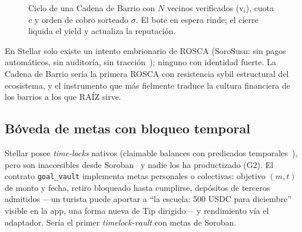 \documentclass[twocolumn,10pt]{article}
\begin{document}
\begin{figure}[t]
\centering
{}
\caption{Ciclo de una Cadena de Barrio con $N$ vecinos verificados (v$_i$), cuota $c$ y orden de cobro sorteado $\sigma$. El bote en espera rinde; el cierre liquida el yield y actualiza la reputaci\'on.}
\label{fig:cadena}
\end{figure}

En Stellar solo existe un intento embrionario de ROSCA (SoroSusu: sin pagos autom\'aticos, sin auditor\'ia, sin tracci\'on~\cite{sorosusu}); ninguno con identidad fuerte. La Cadena de Barrio ser\'ia la primera ROSCA con resistencia sybil estructural del ecosistema, y el instrumento que m\'as fielmente traduce la cultura financiera de los barrios a los que RA\'IZ sirve.

\subsection{B\'oveda de metas con bloqueo temporal}

Stellar posee \emph{time-locks} nativos (claimable balances con predicados temporales~\cite{cap23}), pero son inaccesibles desde Soroban~\cite{sac} y nadie los ha productizado (G2). El contrato \texttt{goal\_vault} implementa metas personales o colectivas: objetivo $(m, t)$ de monto y fecha, retiro bloqueado hasta cumplirse, dep\'ositos de terceros admitidos ---un turista puede aportar a ``la escuela: 500 USDC para diciembre'' visible en la app, una forma nueva de Tip dirigido--- y rendimiento v\'ia el adaptador. Ser\'ia el primer \emph{timelock-vault} con metas de Soroban.
\end{document}

